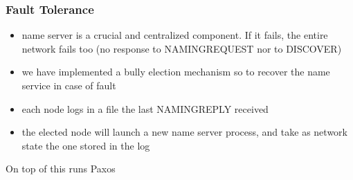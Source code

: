 \documentclass{beamer}
\begin{document}
\begin{frame}
  \frametitle{Fault Tolerance}
  \begin{itemize}
  \item name server is a crucial and centralized component. If it fails, the entire network fails too (no response to NAMINGREQUEST nor to DISCOVER)
  \item we have implemented a bully election mechanism so to recover the name service in case of fault
  \item each node logs in a file the last NAMINGREPLY received
  \item the elected node will launch a new name server process, and take as network state the one stored in the log
  \end{itemize}
\end{frame}

\begin{frame}
  \begin{center}
    \huge On top of this runs Paxos
  \end{center}
\end{frame}
\end{document}
